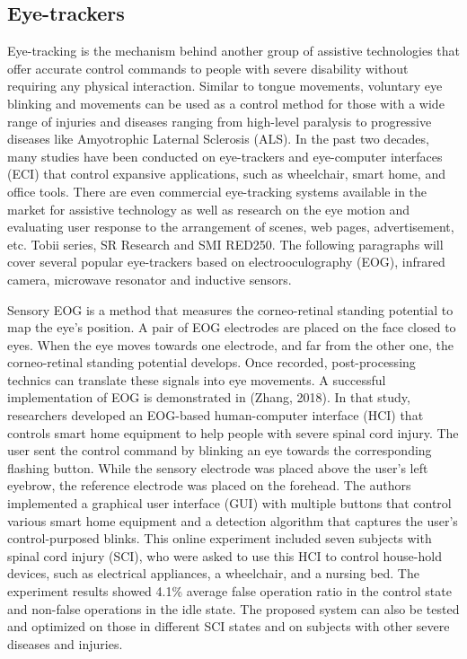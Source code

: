 \subsection{Eye-trackers}
Eye-tracking is the mechanism behind another group of assistive technologies that offer accurate control commands to people with severe disability without requiring any physical interaction. Similar to tongue movements, voluntary eye blinking and movements can be used as a control method for those with a wide range of injuries and diseases ranging from high-level paralysis to progressive diseases like Amyotrophic Laternal Sclerosis (ALS). In the past two decades, many studies have been conducted on eye-trackers and eye-computer interfaces (ECI) that control expansive applications, such as wheelchair, smart home, and office tools. There are even commercial eye-tracking systems available in the market for assistive technology as well as research on the eye motion and evaluating user response to the arrangement of scenes, web pages, advertisement, etc. Tobii series, SR Research and SMI RED250. The following paragraphs will cover several popular eye-trackers based on electrooculography (EOG), infrared camera, microwave resonator and inductive sensors. 


Sensory EOG is a method that measures the corneo-retinal standing potential to map the eye's position. A pair of EOG electrodes are placed on the face closed to eyes. When the eye moves towards one electrode, and far from the other one, the corneo-retinal standing potential develops.  Once recorded, post-processing technics can translate these signals into eye movements. A successful implementation of EOG is demonstrated in (Zhang, 2018). In that study, researchers developed an EOG-based human-computer interface (HCI) that controls smart home equipment to help people with severe spinal cord injury. The user sent the control command by blinking an eye towards the corresponding flashing button. While the sensory electrode was placed above the user's left eyebrow, the reference electrode was placed on the forehead. The authors implemented a graphical user interface (GUI) with multiple buttons that control various smart home equipment and a detection algorithm that captures the user's control-purposed blinks. This online experiment included seven subjects with spinal cord injury (SCI), who were asked to use this HCI to control house-hold devices, such as electrical appliances, a wheelchair, and a nursing bed. The experiment results showed 4.1\% average false operation ratio in the control state and non-false operations in the idle state. The proposed system can also be tested and optimized on those in different SCI states and on subjects with other severe diseases and injuries. 

